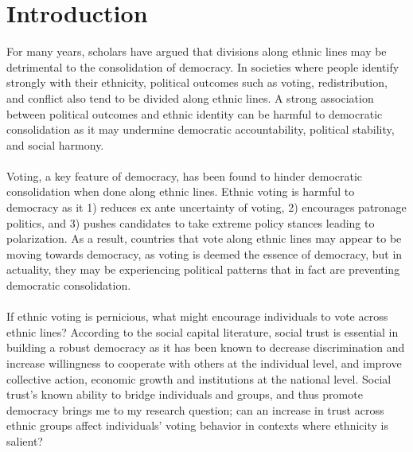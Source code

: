 \documentclass[a4paper, 12pt]{article}
\begin{document}
\section{Introduction}
For many years, scholars have argued that divisions along ethnic lines may be detrimental to the consolidation of democracy\cite{dahlPolyarchyParticipationOpposition1973, horowitzEthnicGroupsConflict1985, lijphartDemocracyPluralSocieties1977, rabushkaPoliticsPluralSocieties1972}. In societies where people identify strongly with their ethnicity, political outcomes such as voting\cite{adidaAfricanVotersFavor2015, barretoISiSePuede2007}, redistribution\cite{houleInequalityEthnicDiversity2017}, and conflict\cite{caselliTheoryEthnicConflict2013, kingDiversityViolenceRecognition2020} also tend to be divided along ethnic lines. A strong association between political outcomes and ethnic identity can be harmful to democratic consolidation as it may undermine democratic accountability, political stability, and social harmony.
\paragraph{}
Voting, a key feature of democracy, has been found to hinder democratic consolidation when done along ethnic lines\cite{houleDoesEthnicVoting2018}. Ethnic voting is harmful to democracy as it 1) reduces ex ante uncertainty of voting, 2) encourages patronage politics, and 3) pushes candidates to take extreme policy stances leading to polarization. As a result, countries that vote along ethnic lines may appear to be moving towards democracy, as voting is deemed the essence of democracy, but in actuality, they may be experiencing political patterns that in fact are preventing democratic consolidation.
\paragraph{}
If ethnic voting is pernicious, what might encourage individuals to vote across ethnic lines? According to the social capital literature, social trust is essential in building a robust democracy as it has been known to decrease discrimination and increase willingness to cooperate with others at the individual level, and improve collective action, economic growth and institutions at the national level\cite{uslanerMoralFoundationsTrust2002, bigelowDemocracyAmericaVolume1899, inglehartTrustWellbeingDemocracy1999, putnamWhatMakesDemocracy1993}. Social trust’s known ability to bridge individuals and groups, and thus promote democracy brings me to my research question; can an increase in trust across ethnic groups affect individuals’ voting behavior in contexts where ethnicity is salient?
\end{document}
